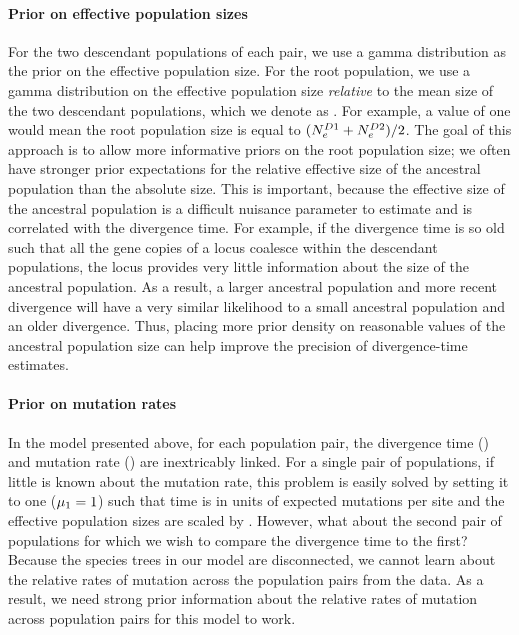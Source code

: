 \paragraph{Prior on effective population sizes}
For the two descendant populations of each pair, we use a gamma distribution as
the prior on the effective population size.
For the root population, we use a gamma distribution on the effective
population size \emph{relative} to the mean size of the two descendant
populations, which we denote as \rootrelativepopsize.
For example, a value of one would mean the root population size is equal to 
$(\epopsize[\descendantpopindex{1}] + \epopsize[\descendantpopindex{2}]) / 2$.
The goal of this approach is to allow more informative priors on the root
population size; we often have stronger prior expectations for the relative
effective size of the ancestral population than the absolute size.
This is important, because the effective size of the ancestral population is a
difficult nuisance parameter to estimate and is correlated with the divergence
time.
For example, if the divergence time is so old such that all the gene copies
of a locus coalesce within the descendant populations, the locus
provides very little information about the size of the ancestral
population.
As a result, a larger ancestral population and more recent divergence will have
a very similar likelihood to a small ancestral population and an older
divergence.
Thus, placing more prior density on reasonable values of the ancestral
population size can help improve the precision of divergence-time estimates.

\paragraph{Prior on mutation rates}
In the model presented above, for each population pair, the divergence time
(\divtime) and mutation rate (\murate) are inextricably linked.
For a single pair of populations, if little is known about the mutation rate,
this problem is easily solved by setting it to one ($\murate[1] = 1$) such
that time is in units of expected mutations per site and the effective
population sizes are scaled by \murate.
However, what about the second pair of populations for which we wish to compare
the divergence time to the first?
Because the species trees in our model are disconnected, we cannot learn about
the relative rates of mutation across the population pairs from the data.
As a result, we need strong prior information about the relative rates of
mutation across population pairs for this model to work.

